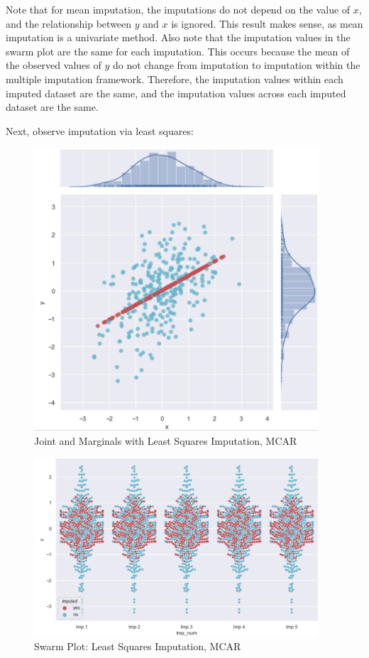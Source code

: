 \documentclass[12pt,oneside]{chicagocapstone}
\begin{document}
Note that for mean imputation, the imputations do not depend on the
value of \(x\), and the relationship between \(y\) and \(x\) is ignored.
This result makes sense, as mean imputation is a univariate method. Also
note that the imputation values in the swarm plot are the same for each
imputation. This occurs because the mean of the observed values of \(y\)
do not change from imputation to imputation within the multiple
imputation framework. Therefore, the imputation values within each
imputed dataset are the same, and the imputation values across each
imputed dataset are the same.

Next, observe imputation via least squares:
\begin{figure}

{\centering \includegraphics[width=400px]{figure/multi-lm} 

}

\caption{Joint and Marginals with Least Squares Imputation, MCAR}\label{fig:multi-lm}
\end{figure}
\begin{figure}

{\centering \includegraphics[width=400px]{figure/swarm-lm} 

}

\caption{Swarm Plot: Least Squares Imputation, MCAR}\label{fig:swarm-lm}
\end{figure}
\end{document}
